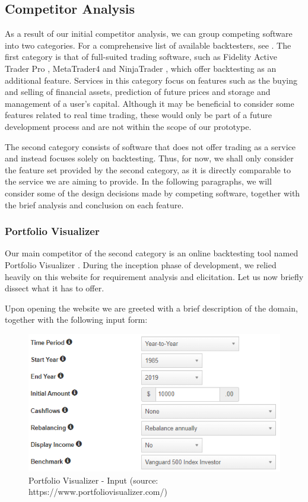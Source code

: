 \documentclass[main.tex]{subfiles}
\begin{document}
\subsection{Competitor Analysis}

As a result of our initial competitor analysis, we can group competing software into two categories. For a comprehensive list of available backtesters, see \cite{listofbacktesters}. The first category is that of full-suited trading software, such as Fidelity Active Trader Pro \cite{Fidelity}, MetaTrader4 \cite{MetaTrader} and NinjaTrader \cite{NinjaTrader}, which offer backtesting as an additional feature. Services in this category focus on features such as the buying and selling of financial assets, prediction of future prices and storage and management of a user's capital. Although it may be beneficial to consider some features related to real time trading, these would only be part of a future development process and are not within the scope of our prototype.

The second category consists of software that does not offer trading as a service and instead focuses solely on backtesting. Thus, for now, we shall only consider the feature set provided by the second category, as it is directly comparable to the service we are aiming to provide. In the following paragraphs, we will consider some of the design decisions made by competing software, together with the brief analysis and conclusion on each feature.

\subsubsection{Portfolio Visualizer}
Our main competitor of the second category is an online backtesting tool named Portfolio Visualizer \cite{portfoliovis}. During the inception phase of development, we relied heavily on this website for requirement analysis and elicitation. Let us now briefly dissect what it has to offer. 

Upon opening the website we are greeted with a brief description of the domain, together with the following input form:

\begin{figure}[H]
   \centering
   \includegraphics[scale=0.8]{02Background/02Pictures/portfolio_visualizer_input_1.png}
   \caption{Portfolio Visualizer - Input (source: https://www.portfoliovisualizer.com/)}
\end{figure}
\end{document}
